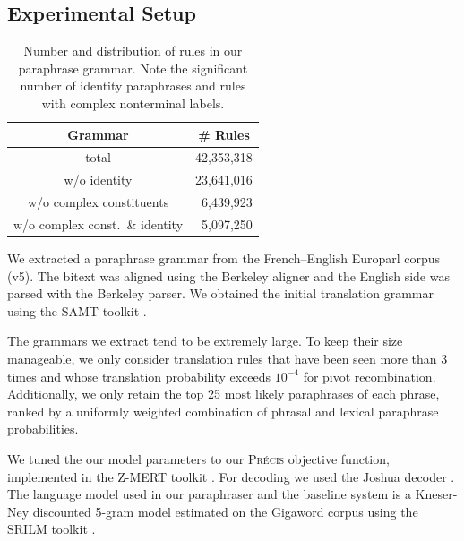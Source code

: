 \documentclass[11pt]{article}
\begin{document}
\subsection{Experimental Setup}
\label{setup}

\begin{table}
\small
\begin{center}
\begin{tabular}{|c|r|}
  \hline
  Grammar & \multicolumn{1}{c|}{\# Rules} \\
  \hline
  total & 42,353,318 \\
  w/o identity & 23,641,016 \\
  w/o complex constituents & 6,439,923 \\
  w/o complex const.\ \& identity & 5,097,250 \\
  \hline
\end{tabular}
\end{center}
\normalsize
\caption{Number and distribution of rules in our paraphrase
  grammar. Note the significant number of identity paraphrases and
  rules with complex nonterminal labels.}
\label{grammar_stats}
\end{table}

We extracted a paraphrase grammar from the French--English Europarl
corpus (v5). The bitext was aligned using the Berkeley aligner and the
English side was parsed with the Berkeley parser. We obtained the
initial translation grammar using the SAMT toolkit \cite{Venugopal2009}.

The grammars we extract tend to be extremely large. To keep their
size manageable, we only consider translation rules that have been
seen more than 3 times and whose translation probability exceeds
$10^{-4}$ for pivot recombination. Additionally, we only retain the
top 25 most likely paraphrases of each phrase, ranked by a uniformly
weighted combination of phrasal and lexical paraphrase probabilities.

We tuned the our model parameters to our \textsc{Pr\'ecis} objective function, implemented in the Z-MERT toolkit \cite{Zaidan2009}. For decoding we used the
Joshua decoder \cite{Joshua-2.0}. The language model used in our
paraphraser and  the  baseline system is a
Kneser-Ney discounted 5-gram model estimated on the Gigaword corpus
using the SRILM toolkit \cite{SRILM}.
\end{document}
